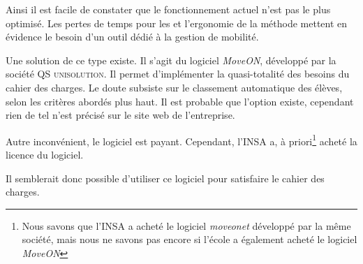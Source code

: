 \bigbreak 

Ainsi il est facile de constater que le fonctionnement actuel n'est pas le plus optimisé. Les pertes de temps pour les \ri et l'ergonomie de la méthode mettent en évidence le besoin d'un outil dédié à la gestion de mobilité. 

Une solution de ce type existe. Il s'agit du logiciel \textit{MoveON}, développé par la société \textsc{QS unisolution}. Il permet d'implémenter la quasi-totalité des besoins du cahier des charges. Le doute subsiste sur le classement automatique des élèves, selon les critères abordés plus haut. Il est probable que l'option existe, cependant rien de tel n'est précisé sur le site web de l'entreprise. 

Autre inconvénient, le logiciel est payant. Cependant, l'INSA a, à priori\footnote{Nous savons que l'INSA a acheté le logiciel \textit{moveonet} développé par la même société, mais nous ne savons pas encore si l'école a également acheté le logiciel \textit{MoveON}}  acheté la licence du logiciel.  

Il semblerait donc possible d'utiliser ce logiciel pour satisfaire le cahier des charges. 